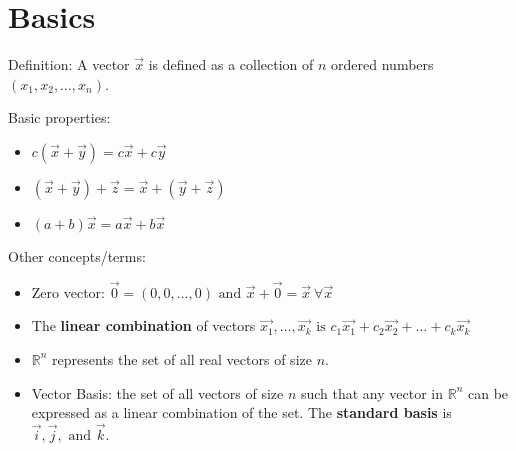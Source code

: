 \documentclass[11pt]{article}
\begin{document}
\section{Basics}
	Definition: A vector $\vec{x}$ is defined as a collection of $n$ ordered numbers $(x_1, x_2,\ldots ,x_n)$.
	
	Basic properties:
	\begin{itemize}
		\item $c(\vec{x} + \vec{y}) = c\vec{x} + c\vec{y}$
		\item $(\vec{x} + \vec{y}) + \vec{z} = \vec{x} + (\vec{y} + \vec{z})$
		\item $(a+b)\vec{x} = a\vec{x} + b\vec{x}$
	\end{itemize}
	
	Other concepts/terms:
	\begin{itemize}
		\item Zero vector: $\vec{0} = (0, 0,\ldots , 0) \text{ and } \vec{x} + \vec{0} = \vec{x} \ \forall \vec{x}$
		\item The \textbf{linear combination} of vectors $\vec{x_1}, \ldots , \vec{x_k} \text{ is } c_1\vec{x_1} + c_2\vec{x_2} + \ldots + c_k\vec{x_k}$
		\item $\mathbb{R}^n$ represents the set of all real vectors of size $n$.
		\item Vector Basis: the set of all vectors of size $n$ such that any vector in $\mathbb{R}^n$ can be expressed as a linear combination of the set. The \textbf{standard basis} is $\vec{i}, \vec{j}, \text{ and } \vec{k}$.
	\end{itemize}
		
\end{document}
